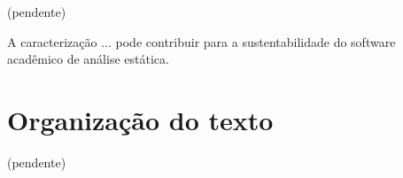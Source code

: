 (pendente)

A caracterização ... pode contribuir para a sustentabilidade do software acadêmico de análise estática.

\section{Organização do texto}

(pendente)

%
%
%
%
%



